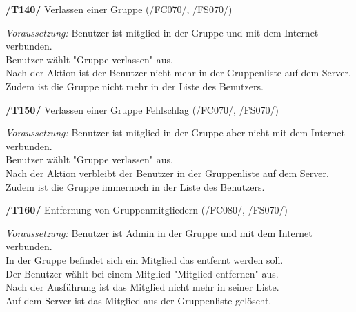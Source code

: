 \textbf{/T140/} Verlassen einer Gruppe (/FC070/, /FS070/)\\
\begin{center}
\vspace{-\parskip}
\begin{minipage}[t]{0.9\textwidth}
\emph{Voraussetzung:} Benutzer ist mitglied in der Gruppe und mit dem Internet verbunden.\\
Benutzer wählt "Gruppe verlassen" aus.\\
Nach der Aktion ist der Benutzer nicht mehr in der Gruppenliste auf dem Server.\\
Zudem ist die Gruppe nicht mehr in der Liste des Benutzers.\\
\end{minipage}
\end{center}

\textbf{/T150/} Verlassen einer Gruppe Fehlschlag (/FC070/, /FS070/)\\
\begin{center}
\vspace{-\parskip}
\begin{minipage}[t]{0.9\textwidth}
\emph{Voraussetzung:} Benutzer ist mitglied in der Gruppe aber nicht mit dem Internet verbunden.\\
Benutzer wählt "Gruppe verlassen" aus.\\
Nach der Aktion verbleibt der Benutzer in der Gruppenliste auf dem Server.\\
Zudem ist die Gruppe immernoch in der Liste des Benutzers.\\
\end{minipage}
\end{center}

\textbf{/T160/} Entfernung von Gruppenmitgliedern (/FC080/, /FS070/)\\
\begin{center}
\vspace{-\parskip}
\begin{minipage}[t]{0.9\textwidth}
\emph{Voraussetzung:} Benutzer ist Admin in der Gruppe und mit dem Internet verbunden.\\
In der Gruppe befindet sich ein Mitglied das entfernt werden soll.              \\
Der Benutzer wählt bei einem Mitglied "Mitglied entfernen" aus.                  \\
Nach der Ausführung ist das Mitglied nicht mehr in seiner Liste.                 \\
Auf dem Server ist das Mitglied aus der Gruppenliste gelöscht.                    \\
\end{minipage}
\end{center}

